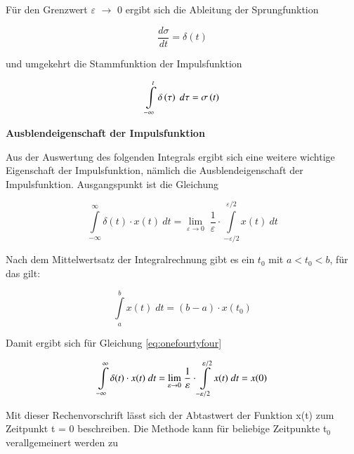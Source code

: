 \noindent F\"{u}r den Grenzwert $\varepsilon$ $\rightarrow$ 0 ergibt sich die Ableitung der Sprungfunktion

\begin{equation}\label{eq:onefourtytwo}
\dfrac{d\sigma }{dt} =\delta \left(t\right)
\end{equation}


\noindent und umgekehrt die Stammfunktion der Impulsfunktion

\begin{equation}\label{eq:onefourtythree}
\int\limits _{-\infty }^{t}\delta \left(\tau \right){\rm \; }d\tau  =\sigma \left(t\right)
\end{equation}

\bigskip

{\selectfont
\noindent\textbf{Ausblendeigenschaft der Impulsfunktion}} \smallskip

\noindent Aus der Auswertung des folgenden Integrals ergibt sich eine weitere wichtige Eigenschaft der Impulsfunktion, n\"{a}mlich die Ausblendeigenschaft der Impulsfunktion. Ausgangspunkt ist die Gleichung 

\begin{equation}\label{eq:onefourtyfour}
\int\limits _{-\infty }^{\infty }\delta (t)\cdot x(t) \: dt ={\lim \limits_{\displaystyle\varepsilon \to 0}} \; \dfrac{1}{\varepsilon } \cdot \int\limits _{-\varepsilon /2}^{\varepsilon /2}x(t) \: dt
\end{equation}

\noindent Nach dem Mittelwertsatz der Integralrechnung gibt es ein $t_{0}$ mit $a < t_{0} < b$, f\"{u}r das gilt:

\begin{equation}\label{eq:onefourtyfive}
\int\limits _{a}^{b}x(t) \; dt =(b-a)\cdot x(t_{0} )
\end{equation}

\noindent Damit ergibt sich f\"{u}r Gleichung \ref{eq:onefourtyfour}

\begin{equation}\label{eq:onefourtysix}
\int\limits _{-\infty }^{\infty }\delta (t)\cdot x(t) \; dt ={\lim \limits_{\varepsilon \to 0}} {\rm \; }\dfrac{1}{\varepsilon } \cdot \int\limits _{-\varepsilon /2}^{\varepsilon /2}x(t) \; dt =x(0)
\end{equation}

\noindent Mit dieser Rechenvorschrift l\"{a}sst sich der Abtastwert der Funktion x(t) zum Zeitpunkt t = 0 beschreiben. Die Methode kann f\"{u}r beliebige Zeitpunkte t${}_{0}$ verallgemeinert werden zu

